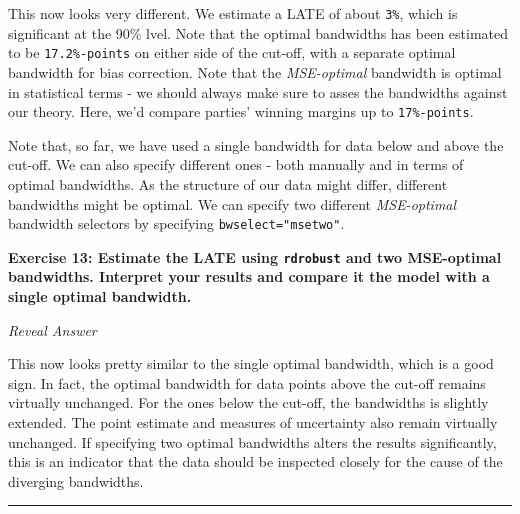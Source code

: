 \documentclass[
  letterpaper,
  DIV=11,
  numbers=noendperiod]{scrreprt}
\newenvironment{Shaded}{\begin{snugshade}}{\end{snugshade}}
\newcommand{\AttributeTok}[1]{\textcolor[rgb]{0.40,0.45,0.13}{#1}}
\newcommand{\DecValTok}[1]{\textcolor[rgb]{0.68,0.00,0.00}{#1}}
\newcommand{\FunctionTok}[1]{\textcolor[rgb]{0.28,0.35,0.67}{#1}}
\newcommand{\NormalTok}[1]{\textcolor[rgb]{0.00,0.23,0.31}{#1}}
\newcommand{\OtherTok}[1]{\textcolor[rgb]{0.00,0.23,0.31}{#1}}
\newcommand{\SpecialCharTok}[1]{\textcolor[rgb]{0.37,0.37,0.37}{#1}}
\newcommand{\StringTok}[1]{\textcolor[rgb]{0.13,0.47,0.30}{#1}}
\begin{document}
This now looks very different. We estimate a LATE of about \texttt{3\%},
which is significant at the 90\% lvel. Note that the optimal bandwidths
has been estimated to be \texttt{17.2\%-points} on either side of the
cut-off, with a separate optimal bandwidth for bias correction. Note
that the \emph{MSE-optimal} bandwidth is optimal in statistical terms -
we should always make sure to asses the bandwidths against our theory.
Here, we'd compare parties' winning margins up to \texttt{17\%-points}.

\hfill\break

Note that, so far, we have used a single bandwidth for data below and
above the cut-off. We can also specify different ones - both manually
and in terms of optimal bandwidths. As the structure of our data might
differ, different bandwidths might be optimal. We can specify two
different \emph{MSE-optimal} bandwidth selectors by specifying
\texttt{bwselect="msetwo"}.

\textbf{Exercise 13: Estimate the LATE using \texttt{rdrobust} and two
MSE-optimal bandwidths. Interpret your results and compare it the model
with a single optimal bandwidth.}

\emph{Reveal Answer}

\begin{Shaded}
\end{Shaded}

This now looks pretty similar to the single optimal bandwidth, which is
a good sign. In fact, the optimal bandwidth for data points above the
cut-off remains virtually unchanged. For the ones below the cut-off, the
bandwidths is slightly extended. The point estimate and measures of
uncertainty also remain virtually unchanged. If specifying two optimal
bandwidths alters the results significantly, this is an indicator that
the data should be inspected closely for the cause of the diverging
bandwidths.

\hfill\break

\begin{center}\rule{0.5\linewidth}{0.5pt}\end{center}
\end{document}
